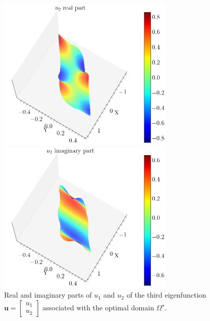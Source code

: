 \begin{figure}[!htb]
    \begin{minipage}[b]{0.45\textwidth}
        \centering
        \includegraphics[width=0.75\textwidth]{Images/Dirac/smooth/optimal_lambda3_m_1_u2_re.png}
    \end{minipage}
    \hfill
    \begin{minipage}[b]{0.45\textwidth}
        \centering
        \includegraphics[width=0.75\textwidth]{Images/Dirac/smooth/optimal_lambda3_m_1_u2_im.png}
    \end{minipage}
    \caption{Real and imaginary parts of \(u_1\) and \(u_2\) of the third eigenfunction \(\mathbf{u}=\begin{bmatrix} u_1\\ u_2 \end{bmatrix}\) associated with the optimal domain \(\Omega^\star\).}
    \label{dirac_optimal_plots_eigenfunctions}
\end{figure}

